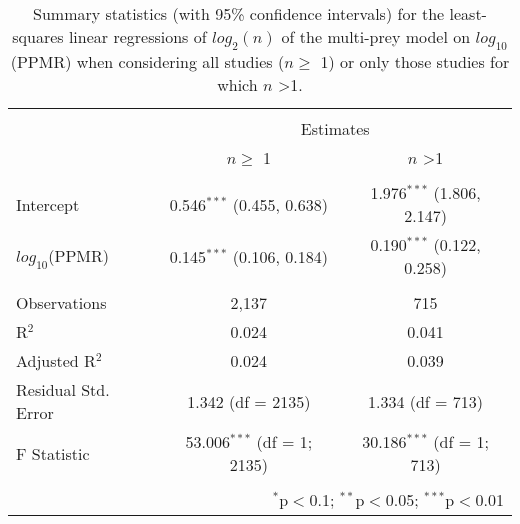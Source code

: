 
\begin{table}[!htbp] \centering 
  \caption{Summary statistics (with 95\% confidence intervals) for the least-squares linear regressions of $log_2(n)$ of the multi-prey model on $log_{10}$(PPMR) when considering all studies ($n \geq$ 1) or only those studies for which $n$ \textgreater 1.} 
  \label{tab:n-ppmr} 
\begin{tabular}{@{\extracolsep{5pt}}lcc} 
\\[-1.8ex]\hline 
\hline \\[-1.8ex] 
 & \multicolumn{2}{c}{Estimates} \\ 
\cline{2-3} 
 & $n \geq$ 1 & $n$ \textgreater 1 \\ 
\hline \\[-1.8ex] 
 Intercept & 0.546$^{***}$ (0.455, 0.638) & 1.976$^{***}$ (1.806, 2.147) \\ 
  $log_{10}$(PPMR) & 0.145$^{***}$ (0.106, 0.184) & 0.190$^{***}$ (0.122, 0.258) \\ 
 \hline \\[-1.8ex] 
Observations & 2,137 & 715 \\ 
R$^{2}$ & 0.024 & 0.041 \\ 
Adjusted R$^{2}$ & 0.024 & 0.039 \\ 
Residual Std. Error & 1.342 (df = 2135) & 1.334 (df = 713) \\ 
F Statistic & 53.006$^{***}$ (df = 1; 2135) & 30.186$^{***}$ (df = 1; 713) \\ 
\hline 
\hline \\[-1.8ex] 
\multicolumn{3}{r}{$^{*}$p$<$0.1; $^{**}$p$<$0.05; $^{***}$p$<$0.01} \\ 
\end{tabular} 
\end{table} 
